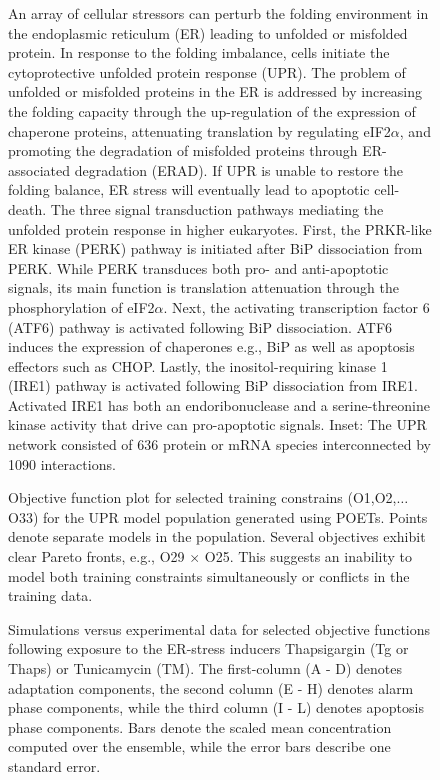 \begin{figure}\centering
{}
	\caption{An array of cellular stressors can perturb the folding environment in the endoplasmic reticulum (ER) leading to unfolded or misfolded protein. In response to the folding imbalance, cells initiate the cytoprotective unfolded protein response (UPR). The problem of unfolded or misfolded proteins in the ER is addressed by increasing the folding capacity through the up-regulation of the expression of chaperone proteins, attenuating translation by regulating eIF2$\alpha$, and promoting the degradation of misfolded proteins through ER-associated degradation (ERAD). If UPR is unable to restore the folding balance, ER stress will eventually lead to apoptotic cell-death. The three signal transduction pathways mediating the unfolded protein response in higher eukaryotes. First, the PRKR-like ER kinase (PERK) pathway is initiated after BiP dissociation from PERK. While PERK transduces both pro- and anti-apoptotic signals, its main function is translation attenuation through the phosphorylation of eIF2$\alpha$. Next, the activating transcription factor 6 (ATF6) pathway is activated following BiP dissociation. ATF6 induces the expression of chaperones e.g., BiP as well as apoptosis effectors such as CHOP. Lastly, the inositol-requiring kinase 1 (IRE1) pathway is activated following BiP dissociation from IRE1. Activated IRE1 has both an endoribonuclease and a serine-threonine kinase activity that drive can pro-apoptotic signals. Inset: The UPR network consisted of 636 protein or mRNA species interconnected by 1090 interactions.}
	\label{fg:fig1}
\end{figure}

\begin{figure}\centering
{}
	\caption{Objective function plot for selected training constrains (O1,O2,$\hdots$O33) for the UPR model population generated using POETs. Points denote separate models in the population. Several objectives exhibit clear Pareto fronts, e.g., O29 $\times$ O25. This suggests an inability to model both training constraints simultaneously or conflicts in the training data.}
	\label{fg:objective_plot}
\end{figure}

\begin{figure}\centering
{}
	\caption{Simulations versus experimental data for selected objective functions following exposure to the ER-stress inducers Thapsigargin (Tg or Thaps) or Tunicamycin (TM). The first-column (A - D) denotes adaptation components, the second column (E - H) denotes alarm phase components, while the third column (I - L) denotes apoptosis phase components. Bars denote the scaled mean concentration computed over the ensemble, while the error bars describe one standard error.}
	\label{fg:simulation_comparison}
\end{figure}

